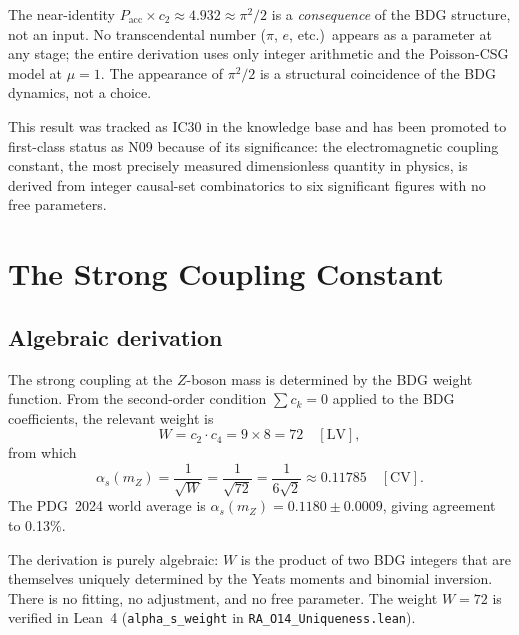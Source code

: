 \documentclass[12pt,a4paper]{article}
\begin{document}
The near-identity $P_{\mathrm{acc}} \times c_2 \approx 4.932 \approx \pi^2/2$ is a \emph{consequence} of the BDG structure, not an input. No transcendental number ($\pi$, $e$, etc.)\ appears as a parameter at any stage; the entire derivation uses only integer arithmetic and the Poisson-CSG model at $\mu=1$. The appearance of $\pi^2/2$ is a structural coincidence of the BDG dynamics, not a choice.

This result was tracked as IC30 in the knowledge base and has been promoted to first-class status as N09 because of its significance: the electromagnetic coupling constant, the most precisely measured dimensionless quantity in physics, is derived from integer causal-set combinatorics to six significant figures with no free parameters.

\section{The Strong Coupling Constant}\label{sec:alpha_s}

\subsection{Algebraic derivation}\label{sec:alpha_s_derivation}

The strong coupling at the $Z$-boson mass is determined by the BDG weight function. From the second-order condition $\sum c_k = 0$ applied to the BDG coefficients, the relevant weight is
\begin{equation}
W = c_2 \cdot c_4 = 9 \times 8 = 72 \quad[\text{LV}],
\label{eq:W}
\end{equation}
from which
\begin{equation}
\boxed{\alpha_s(m_Z) = \frac{1}{\sqrt{W}} = \frac{1}{\sqrt{72}} = \frac{1}{6\sqrt{2}} \approx 0.11785} \quad[\text{CV}].
\label{eq:alpha_s}
\end{equation}
The PDG~2024 world average is $\alpha_s(m_Z) = 0.1180 \pm 0.0009$, giving agreement to 0.13\%.

The derivation is purely algebraic: $W$ is the product of two BDG integers that are themselves uniquely determined by the Yeats moments and binomial inversion. There is no fitting, no adjustment, and no free parameter. The weight $W = 72$ is verified in Lean~4 (\texttt{alpha\_s\_weight} in \texttt{RA\_O14\_Uniqueness.lean}).
\end{document}
